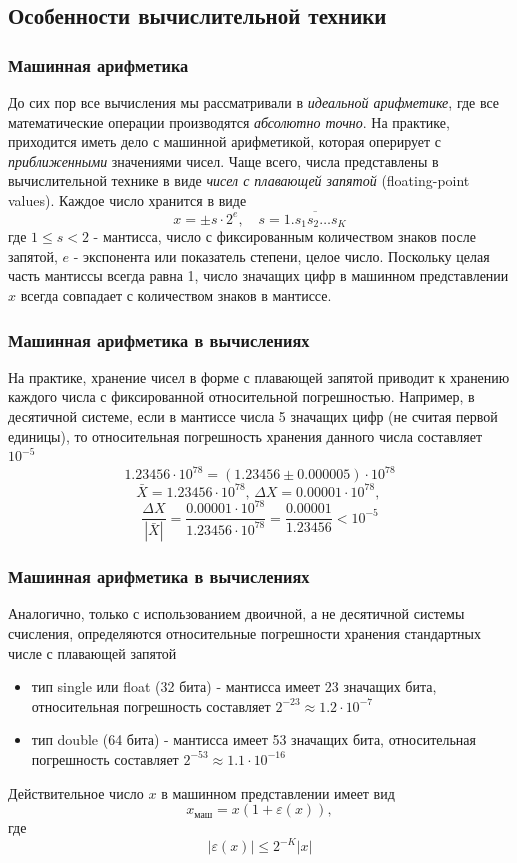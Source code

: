 \documentclass[aspectratio=43,unicode]{beamer}
\begin{document}
\subsection{Особенности вычислительной техники}
\begin{frame}
\frametitle{Машинная арифметика}
	До сих пор все вычисления мы рассматривали в \emph{идеальной арифметике}, где все математические
	операции производятся \emph{абсолютно точно}. На практике, приходится иметь дело с машинной арифметикой,
	которая оперирует с \emph{приближенными} значениями чисел. Чаще всего, числа представлены в
	вычислительной технике в виде \emph{чисел с плавающей запятой} (floating-point values). Каждое число хранится
	в виде
	\[
	x = \pm s \cdot 2^e, \quad s = \overline{1.s_1s_2\dots s_K}
	\]
	где $1 \leqslant s < 2$ - мантисса, число с фиксированным количеством знаков после запятой, $e$ - экспонента или показатель степени,
	целое число. Поскольку целая часть мантиссы всегда равна 1, число значащих цифр в машинном представлении $x$ всегда совпадает с
	количеством знаков в мантиссе.
\end{frame}

\begin{frame}
\frametitle{Машинная арифметика в вычислениях}
	На практике, хранение чисел в форме с плавающей запятой приводит к хранению каждого числа с фиксированной относительной погрешностью.
	Например, в десятичной системе, если в мантиссе числа 5 значащих цифр (не считая первой единицы),
	то относительная погрешность хранения данного числа составляет $10^{-5}$
	\[
	1.23456 \cdot 10^{78} = (1.23456 \pm 0.000005) \cdot 10^{78}
	\]
	\[
	\bar X = 1.23456 \cdot 10^{78}, \,
	\Delta X = 0.00001 \cdot 10^{78}, \,
	\]
	\[
	\frac{\Delta X}{|\bar X|} = \frac{0.00001\cdot 10^{78}}{1.23456\cdot 10^{78}} = \frac{0.00001}{1.23456} < 10^{-5}
	\]
\end{frame}

\begin{frame}
\frametitle{Машинная арифметика в вычислениях}
	Аналогично, только с использованием двоичной, а не десятичной системы счисления, определяются
	относительные погрешности хранения стандартных числе с плавающей запятой
	\begin{itemize}
		\item тип single или float (32 бита) - мантисса имеет 23 значащих бита,
		относительная погрешность составляет $2^{-23} \approx 1.2 \cdot 10^{-7}$
		\item тип double (64 бита) - мантисса имеет 53 значащих бита,
		относительная погрешность составляет $2^{-53} \approx 1.1 \cdot 10^{-16}$
	\end{itemize}

	Действительное число $x$ в машинном представлении имеет вид
	\[
		x_\text{маш} = x (1 + \varepsilon(x)),
	\]
	где \[|\varepsilon(x)| \leqslant 2^{-K} |x|\]
\end{frame}
\end{document}
